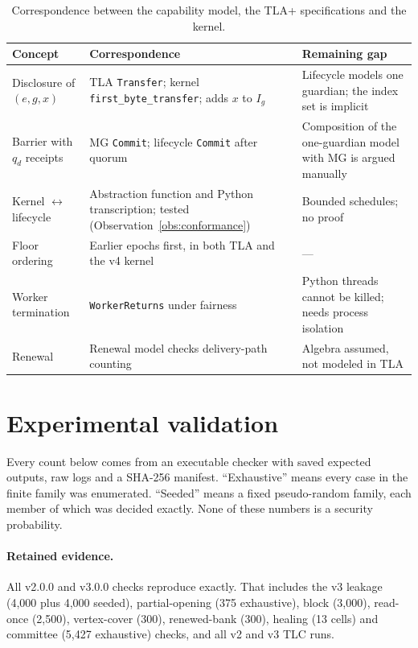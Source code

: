 \documentclass[pdflatex,sn-mathphys-num,twocolumn]{sn-jnl}
\theoremstyle{plain}
\theoremstyle{definition}
\newcommand{\code}[1]{\texttt{#1}}
\begin{document}
\begin{table}[t]
\caption{Correspondence between the capability model, the TLA+ specifications and the kernel.}\label{tab:refine}
\centering\footnotesize
\begin{tabularx}{\linewidth}{@{}p{.25\linewidth}YY@{}}\toprule
Concept & Correspondence & Remaining gap\\\midrule
Disclosure of $(e,g,x)$ & TLA \code{Transfer}; kernel \code{first\_byte\_transfer}; adds $x$ to $I_g$ & Lifecycle models one guardian; the index set is implicit\\
Barrier with $q_d$ receipts & MG \code{Commit}; lifecycle \code{Commit} after quorum & Composition of the one-guardian model with MG is argued manually\\
Kernel $\leftrightarrow$ lifecycle & Abstraction function and Python transcription; tested (Observation~\ref{obs:conformance}) & Bounded schedules; no proof\\
Floor ordering & Earlier epochs first, in both TLA and the v4 kernel & ---\\
Worker termination & \code{WorkerReturns} under fairness & Python threads cannot be killed; needs process isolation\\
Renewal & Renewal model checks delivery-path counting & Algebra assumed, not modeled in TLA\\\bottomrule
\end{tabularx}
\end{table}


\section{Experimental validation}\label{sec:evidence}

Every count below comes from an executable checker with saved expected outputs, raw logs and a SHA-256 manifest. ``Exhaustive'' means every case in the finite family was enumerated. ``Seeded'' means a fixed pseudo-random family, each member of which was decided exactly. None of these numbers is a security probability.

\paragraph{Retained evidence.}
All v2.0.0 and v3.0.0 checks reproduce exactly. That includes the v3 leakage (4,000 plus 4,000 seeded), partial-opening (375 exhaustive), block (3,000), read-once (2,500), vertex-cover (300), renewed-bank (300), healing (13 cells) and committee (5,427 exhaustive) checks, and all v2 and v3 TLC runs.
\end{document}
